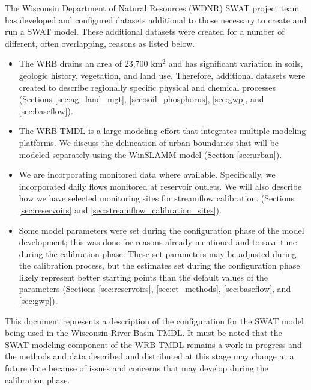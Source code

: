 The Wisconsin Department of Natural Resources (WDNR) SWAT project team has developed and configured datasets additional to those necessary to create and run a SWAT model. These additional datasets were created for a number of different, often overlapping, reasons as listed below. 
\begin{itemize}
\item The WRB drains an area of 23,700 km$^2$ and has significant variation in soils, geologic history, vegetation, and land use. Therefore, additional datasets were created to describe regionally specific physical and chemical processes (Sections \ref{sec:ag_land_mgt}, \ref{sec:soil_phosphorus}, \ref{sec:gwp}, and \ref{sec:baseflow}).

\item The WRB TMDL is a large modeling effort that integrates multiple modeling platforms. We discuss the delineation of urban boundaries that will be modeled separately using the WinSLAMM model (Section \ref{sec:urban}).

\item We are incorporating monitored data where available. Specifically, we incorporated daily flows monitored at reservoir outlets.
We will also describe how we have selected monitoring sites for streamflow calibration. (Sections \ref{sec:reservoirs} and \ref{sec:streamflow_calibration_sites}).
 
\item Some model parameters were set during the configuration phase of the model development; 
this was done for reasons already mentioned and to save time during the calibration phase. 
These set parameters may be adjusted during the calibration process, but the estimates set during the configuration phase likely represent better starting points than the default values of the parameters (Sections \ref{sec:reservoirs}, \ref{sec:et_methods}, \ref{sec:baseflow}, and \ref{sec:gwp}).
\end{itemize}

This document represents a description of the configuration for the SWAT model being used in the Wisconsin River Basin TMDL. 
It must be noted that the SWAT modeling component of the WRB TMDL remains a work in progress and the methods and data described and distributed at this stage may change at a future date because of issues and concerns that may develop during the calibration phase.



